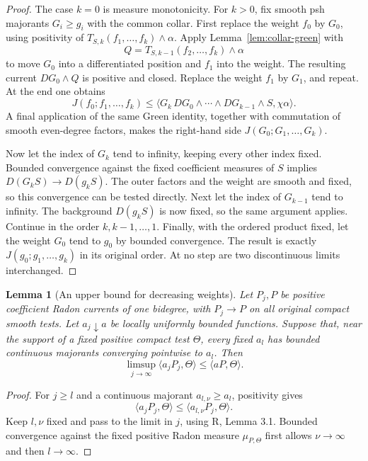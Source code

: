 \documentclass[11pt,a4paper]{article}
\numberwithin{equation}{section}
\newtheorem{lemma}[theorem]{Lemma}
\theoremstyle{definition}
\theoremstyle{remark}
\begin{document}
\begin{proof}
The case $k=0$ is measure monotonicity. For $k>0$, fix smooth psh
majorants $G_i\geq g_i$ with the common collar. First replace the weight
$f_0$ by $G_0$, using positivity of
$T_{S,k}(f_1,\ldots,f_k)\wedge\alpha$. Apply
Lemma~\ref{lem:collar-green} with
\[
 Q=T_{S,k-1}(f_2,\ldots,f_k)\wedge\alpha
\]
to move $G_0$ into a differentiated position and $f_1$ into the weight.
The resulting current $DG_0\wedge Q$ is positive and closed. Replace
the weight $f_1$ by $G_1$, and repeat. At the end one obtains
\[
 J(f_0;f_1,\ldots,f_k)
 \leq\langle G_k\,DG_0\wedge\cdots\wedge DG_{k-1}\wedge S,
                     \chi\alpha\rangle.
\]
A final application of the same Green identity, together with
commutation of smooth even-degree factors, makes the right-hand side
$J(G_0;G_1,\ldots,G_k)$.

Now let the index of $G_k$ tend to infinity, keeping every other index
fixed. Bounded convergence against the fixed coefficient measures of
$S$ implies $D(G_kS)\to D(g_kS)$. The outer factors and the weight are
smooth and fixed, so this convergence can be tested directly. Next let
the index of $G_{k-1}$ tend to infinity. The background
$D(g_kS)$ is now fixed, so the same argument applies. Continue in the
order $k,k-1,\ldots,1$. Finally, with the ordered product fixed, let the
weight $G_0$ tend to $g_0$ by bounded convergence. The result is exactly
$J(g_0;g_1,\ldots,g_k)$ in its original order. At no step are two
discontinuous limits interchanged.
\end{proof}

\begin{lemma}[An upper bound for decreasing weights]
\label{lem:upper-weight}
Let $P_j,P$ be positive coefficient Radon currents of one bidegree,
with $P_j\to P$ on all original compact smooth tests. Let $a_j\downarrow a$
be locally uniformly bounded functions. Suppose that, near the support
of a fixed positive compact test $\Theta$, every fixed $a_l$ has bounded
continuous majorants converging pointwise to $a_l$.
Then
\[
 \limsup_{j\to\infty}\langle a_jP_j,\Theta\rangle
       \leq\langle aP,\Theta\rangle.
\]
\end{lemma}

\begin{proof}
For $j\geq l$ and a continuous majorant $a_{l,\nu}\geq a_l$,
positivity gives
\[
 \langle a_jP_j,\Theta\rangle
       \leq\langle a_{l,\nu}P_j,\Theta\rangle.
\]
Keep $l,\nu$ fixed and pass to the limit in $j$, using \textup{R},
Lemma 3.1. Bounded convergence against the fixed positive Radon measure
$\mu_{P,\Theta}$ first allows $\nu\to\infty$ and then $l\to\infty$.
\end{proof}
\end{document}
